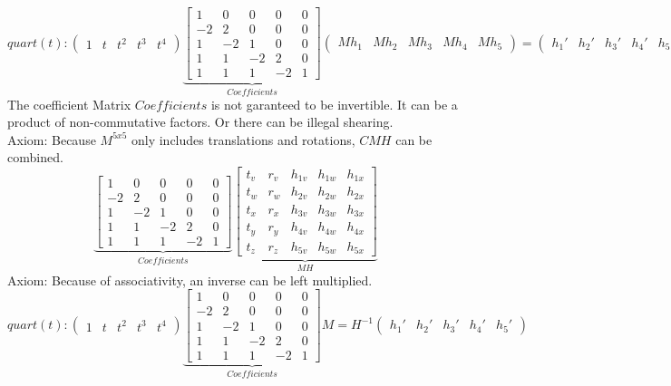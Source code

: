 \documentclass[a4paper,landscape]{report}
\begin{document}
\begin{equation}
quart(t):
\begin{pmatrix}
1 & t & t^2 & t^3 & t^4
\end{pmatrix}
\underbrace{\begin{bmatrix}
1 & 0 & 0 & 0 & 0\\
-2 & 2 & 0 & 0 & 0\\
1 & -2 &1 & 0 & 0\\
1 & 1 & -2 & 2 & 0\\
1 & 1 & 1 & -2 & 1
\end{bmatrix}}_{Coefficients}
\begin{pmatrix}
Mh_{1} & Mh_{2} & Mh_{3} & Mh_{4} & Mh_{5}
\end{pmatrix}
=
\begin{pmatrix}
h_{1}' & h_{2}' & h_{3}' & h_{4}' & h_{5}'
\end{pmatrix}
\end{equation}
The coefficient Matrix $Coefficients$ is not garanteed to be invertible. It can be a product of non-commutative factors. Or there can be illegal shearing.\\
Axiom: Because $M^{5x5}$ only includes translations and rotations, $CMH$ can be combined.
\begin{equation}
\underbrace{\begin{bmatrix}
1 & 0 & 0 & 0 & 0\\
-2 & 2 & 0 & 0 & 0\\
1 & -2 &1 & 0 & 0\\
1 & 1 & -2 & 2 & 0\\
1 & 1 & 1 & -2 & 1
\end{bmatrix}}_{Coefficients}
\underbrace{\begin{bmatrix}
t_{v} & r_{v} & h_{1v} & h_{1w} & h_{1x}\\
t_{w} & r_{w} & h_{2v} & h_{2w} & h_{2x}\\
t_{x} & r_{x} & h_{3v} & h_{3w} & h_{3x}\\
t_{y} & r_{y} & h_{4v} & h_{4w} & h_{4x}\\
t_{z} & r_{z} & h_{5v} & h_{5w} & h_{5x}
\end{bmatrix}}_{MH}
\end{equation}
Axiom: Because of associativity, an inverse can be left multiplied.
\begin{equation}
quart(t):
\begin{pmatrix}
1 & t & t^2 & t^3 & t^4
\end{pmatrix}
\underbrace{\begin{bmatrix}
1 & 0 & 0 & 0 & 0\\
-2 & 2 & 0 & 0 & 0\\
1 & -2 &1 & 0 & 0\\
1 & 1 & -2 & 2 & 0\\
1 & 1 & 1 & -2 & 1
\end{bmatrix}}_{Coefficients}
M
=
H^{-1}
\begin{pmatrix}
h_{1}' & h_{2}' & h_{3}' & h_{4}' & h_{5}'
\end{pmatrix}
\end{equation}
\end{document}
